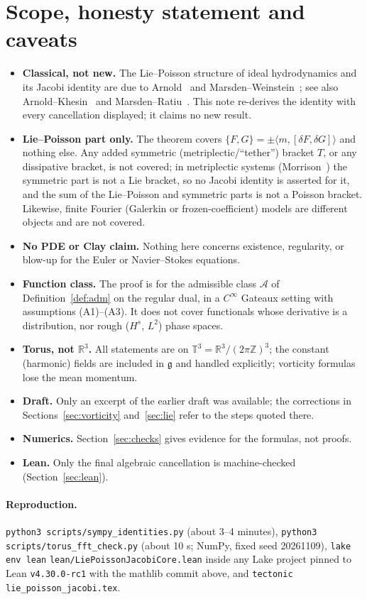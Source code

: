 \documentclass[11pt]{article}
\theoremstyle{definition}
\newcommand{\T}{\mathbb{T}^3}
\newcommand{\R}{\mathbb{R}}
\newcommand{\Z}{\mathbb{Z}}
\newcommand{\g}{\mathfrak{g}}
\newcommand{\ip}[2]{\langle #1,#2\rangle}
\begin{document}
\section{Scope, honesty statement and caveats}
\begin{itemize}
\item \textbf{Classical, not new.} The Lie--Poisson structure of ideal hydrodynamics and its Jacobi identity
are due to Arnold~\cite{arnold1966} and Marsden--Weinstein~\cite{mw1983}; see also
Arnold--Khesin~\cite{ak} and Marsden--Ratiu~\cite{mr}. This note re-derives the identity with every
cancellation displayed; it claims no new result.
\item \textbf{Lie--Poisson part only.} The theorem covers $\{F,G\}=\pm\ip m{[\delta F,\delta G]}$ and nothing
else. Any added symmetric (metriplectic/``tether'') bracket $T$, or any dissipative bracket, is not covered;
in metriplectic systems (Morrison~\cite{morrison1986}) the symmetric part is not a Lie bracket, so no Jacobi
identity is asserted for it, and the sum of the Lie--Poisson and symmetric parts is not a Poisson bracket.
Likewise, finite Fourier (Galerkin or frozen-coefficient) models are different objects and are not covered.
\item \textbf{No PDE or Clay claim.} Nothing here concerns existence, regularity, or blow-up for the Euler or
Navier--Stokes equations.
\item \textbf{Function class.} The proof is for the admissible class $\mathcal A$ of Definition~\ref{def:adm}
on the regular dual, in a $C^\infty$ Gateaux setting with assumptions (A1)--(A3). It does not cover
functionals whose derivative is a distribution, nor rough ($H^s$, $L^2$) phase spaces.
\item \textbf{Torus, not $\R^3$.} All statements are on $\T=\R^3/(2\pi\Z)^3$; the constant (harmonic) fields
are included in $\g$ and handled explicitly; vorticity formulas lose the mean momentum.
\item \textbf{Draft.} Only an excerpt of the earlier draft was available; the corrections in
Sections~\ref{sec:vorticity} and~\ref{sec:lie} refer to the steps quoted there.
\item \textbf{Numerics.} Section~\ref{sec:checks} gives evidence for the formulas, not proofs.
\item \textbf{Lean.} Only the final algebraic cancellation is machine-checked (Section~\ref{sec:lean}).
\end{itemize}

\paragraph{Reproduction.} \texttt{python3 scripts/sympy\_identities.py} (about 3--4 minutes),
\texttt{python3 scripts/torus\_fft\_check.py} (about 10 s; NumPy, fixed seed 20261109),
\texttt{lake env lean} \texttt{lean/LiePoissonJacobiCore.lean} inside any Lake project pinned to Lean
\texttt{v4.30.0-rc1} with the mathlib commit above, and \texttt{tectonic} \texttt{lie\_poisson\_jacobi.tex}.
\end{document}
